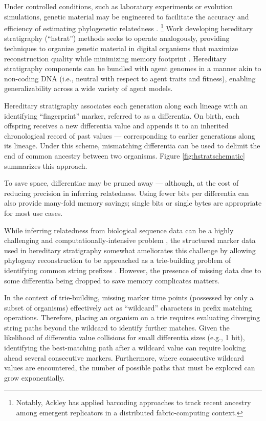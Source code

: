 Under controlled conditions, such as laboratory experiments or evolution simulations, genetic material may be engineered to facilitate the accuracy and efficiency of estimating phylogenetic relatedness \citep{li2024reconstructing,ackley2023robust}.%
\footnote{Notably, Ackley has applied barcoding approaches to track recent ancestry among emergent replicators in a distributed fabric-computing context.}
Work developing hereditary stratigraphy (``hstrat'') methods seeks to operate analogously, providing techniques to organize genetic material in digital organisms that maximize reconstruction quality while minimizing memory footprint \citep{moreno2022hereditary}.
Hereditary stratigraphy components can be bundled with agent genomes in a manner akin to non-coding DNA (i.e., neutral with respect to agent traits and fitness), enabling generalizability across a wide variety of agent models.

Hereditary stratigraphy associates each generation along each lineage with an identifying ``fingerprint'' marker, referred to as a differentia.
On birth, each offspring receives a new differentia value and appends it to an inherited chronological record of past values --- corresponding to earlier generations along its lineage.
Under this scheme, mismatching differentia can be used to delimit the end of common ancestry between two organisms.
Figure \ref{fig:hstratschematic} summarizes this approach.

To save space, differentiae may be pruned away --- although, at the cost of reducing precision in inferring relatedness.
Using fewer bits per differentia can also provide many-fold memory savings; single bits or single bytes are appropriate for most use cases.

While inferring relatedness from biological sequence data can be a highly challenging and computationally-intensive problem \citep{miller2010creating},
the structured marker data used in hereditary stratigraphy somewhat ameliorates this challenge by allowing phylogeny reconstruction to be approached as a trie-building problem of identifying common string prefixes \citep{delabriandais1959file,moreno2024analysis}.
However, the presence of missing data due to some differentia being dropped to save memory complicates matters.

In the context of trie-building, missing marker time points (possessed by only a subset of organisms) effectively act as ``wildcard'' characters in prefix matching operations.
Therefore, placing an organism on a trie requires evaluating diverging string paths beyond the wildcard to identify further matches.
Given the likelihood of differentia value collisions for small differentia sizes (e.g., 1 bit), identifying the best-matching path after a wildcard value can require looking ahead several consecutive markers.
Furthermore, where consecutive wildcard values are encountered, the number of possible paths that must be explored can grow exponentially.

